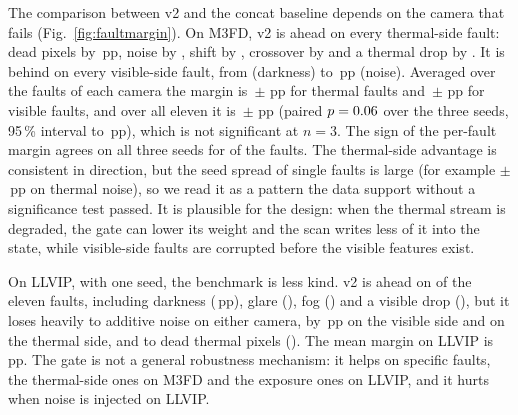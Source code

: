 The comparison between v2 and the concat baseline depends on the camera that fails (Fig.~\ref{fig:faultmargin}). On M3FD, v2 is ahead on every thermal-side fault: dead pixels by \fltMfdMarginThermalDeadSevThreeMeanMap{}\,pp, noise by \fltMfdMarginThermalNoiseSevThreeMeanMap{}, shift by \fltMfdMarginThermalShiftSevThreeMeanMap{}, crossover by \fltMfdMarginThermalCrossoverSevThreeMeanMap{} and a thermal drop by \fltMfdMarginThermalDropSevThreeMeanMap{}. It is behind on every visible-side fault, from \fltMfdMarginVisibleDarkSevThreeMeanMap{} (darkness) to \fltMfdMarginVisibleNoiseSevThreeMeanMap{}\,pp (noise). Averaged over the faults of each camera the margin is \fltMfdMarginMeanThermalAvgSevThreeMap{}\,$\pm$\,\fltMfdMarginStdThermalAvgSevThreeMap{}\,pp for thermal faults and \fltMfdMarginMeanVisibleAvgSevThreeMap{}\,$\pm$\,\fltMfdMarginStdVisibleAvgSevThreeMap{}\,pp for visible faults, and over all eleven it is \fltMfdMarginMeanAvgSevThreeMap{}\,$\pm$\,\fltMfdMarginStdAvgSevThreeMap{}\,pp (paired $p=0.06{}$ over the three seeds, 95\,\% interval \fltMfdMarginAvgCiLow{} to \fltMfdMarginAvgCiHigh{}\,pp), which is not significant at $n=3$. The sign of the per-fault margin agrees on all three seeds for \fltMfdSignAgreeSevThree{} of the \fltMfdFaultCount{} faults. The thermal-side advantage is consistent in direction, but the seed spread of single faults is large (for example $\pm$\fltMfdMarginThermalNoiseSevThreeStdMap{}\,pp on thermal noise), so we read it as a pattern the data support without a significance test passed. It is plausible for the design: when the thermal stream is degraded, the gate can lower its weight and the scan writes less of it into the state, while visible-side faults are corrupted before the visible features exist.

On LLVIP, with one seed, the benchmark is less kind. v2 is ahead on \fltLlvipWinsSevThree{} of the eleven faults, including darkness (\fltLlvipMarginVisibleDarkSevThreeMap{}\,pp), glare (\fltLlvipMarginVisibleGlareSevThreeMap{}), fog (\fltLlvipMarginVisibleFogSevThreeMap{}) and a visible drop (\fltLlvipMarginVisibleDropSevThreeMap{}), but it loses heavily to additive noise on either camera, by \fltLlvipMarginVisibleNoiseSevThreeMap{}\,pp on the visible side and \fltLlvipMarginThermalNoiseSevThreeMap{} on the thermal side, and to dead thermal pixels (\fltLlvipMarginThermalDeadSevThreeMap{}). The mean margin on LLVIP is \fltLlvipMarginAvgSevThreeMap{}\,pp. The gate is not a general robustness mechanism: it helps on specific faults, the thermal-side ones on M3FD and the exposure ones on LLVIP, and it hurts when noise is injected on LLVIP.

